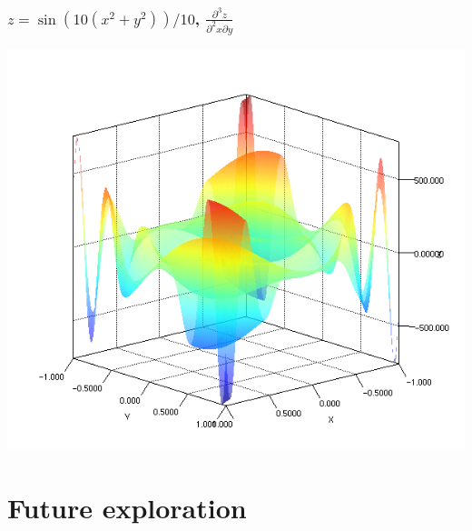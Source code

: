 \documentclass{beamer}
\begin{document}
    \begin{frame}
        \frametitle{$z = \sin(10(x^2 + y^2)) / 10$, $\frac{\partial^3 z}{\partial^2 x \partial y}$}
        \begin{center}
            \includegraphics[scale=0.4]{../figures/plot3d.png}
        \end{center}
    \end{frame}

    \section{Future exploration}
\end{document}
